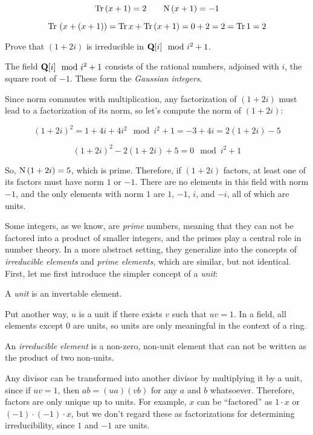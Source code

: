 $${\rm Tr\,} (x+1) = 2 \qquad {\rm N\,} (x+1) = -1$$

$${\rm Tr\,} \left(x + (x+1)\right) = {\rm Tr\,} x + {\rm Tr\,} (x+1) = 0 + 2 = 2 = {\rm Tr\,} 1 = 2$$

\endexample

\example Prove that $(1+2i)$ is irreducible in ${\bf Q}[i] \mod i^2+1$.

The field ${\bf Q}[i] \mod i^2+1$ consists of the rational numbers,
adjoined with $i$, the square root of $-1$.  These form the {\it
Gaussian integers}.

Since norm commutes with multiplication, any factorization of $(1+2i)$
must lead to a factorization of its norm, so let's compute the norm
of $(1+2i)$:

$$(1+2i)^2 = 1 +4i +4i^2 \mod i^2+1 = -3+4i = 2(1+2i) - 5$$

$$(1+2i)^2 - 2(1+2i) +5 =0 \mod i^2+1$$

So, ${\rm N\,}(1+2i) = 5$, which is prime.  Therefore, if $(1+2i)$ factors,
at least one of its factors must have norm $1$ or $-1$.  There
are no elements in this field with norm $-1$, and the only
elements with norm $1$ are $1$, $-1$, $i$, and $-i$, all
of which are units.

\endexample


\vfill\eject


Some integers, as we know, are {\it prime} numbers, meaning that they
can not be factored into a product of smaller integers, and the primes
play a central role in number theory.  In a more abstract setting,
they generalize into the concepts of {\it irreducible elements} and
{\it prime elements}, which are similar, but not identical.
First, let me
first introduce the simpler concept of a {\it unit}:

\begin{key point}
A {\it unit} is an invertable element.
\end{key point}

Put another way, $u$ is a unit if there exists $v$ such that $uv=1$.
In a field, all elements except 0 are units, so units are only
meaningful in the context of a ring.

\begin{key point}
An {\it irreducible element} is a non-zero, non-unit element
that can not be written as the product of two non-units.
\end{key point}

Any divisor can be transformed into another divisor by multiplying it
by a unit, since if $uv=1$, then $ab=(ua)(vb)$ for any $a$ and $b$
whatsoever.  Therefore, factors are only unique up to units.  For
example, $x$ can be ``factored'' as $1 \cdot x$ or $(-1)\cdot(-1)\cdot x$,
but we don't regard these as factorizations for
determining irreducibility, since $1$ and $-1$ are units.

